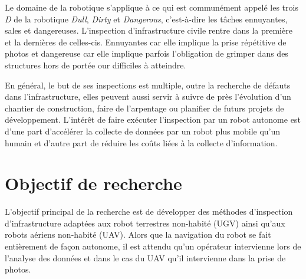 \label{sec:Introduction}  %
Le domaine de la robotique s'applique à ce qui est communément appelé les trois \emph{D} de la robotique \emph{Dull}, \emph{Dirty} et \emph{Dangerous}, c'est-à-dire les tâches ennuyantes, sales et dangereuses. L'inspection d'infrastructure civile rentre dans la première et la dernières de celles-cis. Ennuyantes car elle implique la prise répétitive de photos et dangereuse car elle implique parfois l'obligation de grimper dans des structures hors de portée our difficiles à atteindre.

En général, le but de ses inspections est multiple, outre la recherche de défauts dans l'infrastructure, elles peuvent aussi servir à suivre de près l'évolution d'un chantier de construction, faire de l'arpentage ou planifier de futurs projets de développement. L'intérêt de faire exécuter l'inspection par un robot autonome est d'une part d'accélérer la collecte de données par un robot plus mobile qu'un humain et d'autre part de réduire les coûts liées à la collecte d'information.



\section{Objectif de recherche}

L'objectif principal de la recherche est de développer des méthodes d'inspection d'infrastructure adaptées aux robot terrestres non-habité (UGV) ainsi qu'aux robots aériens non-habité (UAV). Alors que la navigation du robot se fait entièrement de façon autonome, il est attendu qu'un opérateur intervienne lors de l'analyse des données et dans le cas du UAV qu'il intervienne dans la prise de photos.

